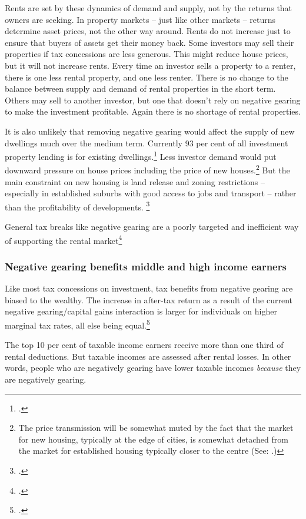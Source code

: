 \documentclass{grattan}\usepackage[]{graphicx}\usepackage[]{color}
\begin{document}
Rents are set by these dynamics of demand and supply, not by the returns that owners are seeking. In property markets -- just like other markets -- returns determine asset prices, not the other way around. Rents do not increase just to ensure that buyers of assets get their money back.
Some investors may sell their properties if tax concessions are less generous. This might reduce house prices, but it will not increase rents. Every time an investor sells a property to a renter, there is one less rental property, and one less renter. There is no change to the balance between supply and demand of rental properties in the short term. Others may sell to another investor, but one that doesn't rely on negative gearing to make the investment profitable. Again there is no shortage of rental properties.

It is also unlikely that removing negative gearing would affect the supply of new dwellings much over the medium term. Currently 93 per cent of all investment property lending is for existing dwellings.\footcite{ABS2015}  Less investor demand would put downward pressure on house prices including the price of new houses.\footnote{The price transmission will be somewhat muted by the fact that the market for new housing, typically at the edge of cities, is somewhat detached from the market for established housing typically closer to the centre (See: \textcite{Kelly2011}.)}  But the main constraint on new housing is land release and zoning restrictions -- especially in established suburbs with good access to jobs and transport -- rather than the profitability of developments.  \footcites{Kelly2013}[pp.84-90]{Kelly2015}

General tax breaks like negative gearing are a poorly targeted and inefficient way of supporting the rental market\footcite[p.~74]{Treasury2010b}

\subsubsection{Negative gearing benefits middle and high income earners}
Like most tax concessions on investment, tax benefits from negative gearing are biased to the wealthy. The increase in after-tax return as a result of the current negative gearing/capital gains interaction is larger for individuals on higher marginal tax rates, all else being equal.\footcite{Inquiry2014}   

The top 10 per cent of taxable income earners receive more than one third of rental deductions. But taxable incomes are assessed after rental losses. In other words, people who are negatively gearing have lower taxable incomes \emph{because} they are negatively gearing.
\end{document}
